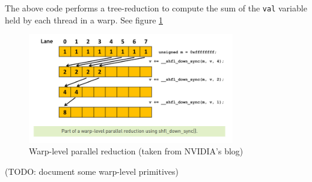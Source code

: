 The above code performs a tree-reduction to compute the sum of
the \texttt{val} variable held by each thread in a warp. See figure
\ref{fig:figures-shfldown-png}

\begin{figure}[h]
    \centering
    \includegraphics[width=0.8\textwidth]{figures/shfldown.png}
    \caption{Warp-level parallel reduction (taken from NVIDIA's blog)}
    \label{fig:figures-shfldown-png}
\end{figure}

(TODO: document some warp-level primitives)
